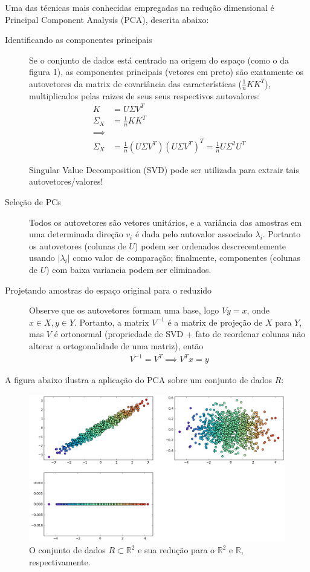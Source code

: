 \documentclass{article}
\begin{document}
	Uma das técnicas mais conhecidas empregadas na redução dimensional é Principal Component Analysis (PCA), descrita abaixo:
	\begin{description}
		\item[Identificando as componentes principais]
		Se o conjunto de dados está centrado na origem do espaço (como o da figura 1), as componentes principais (vetores em preto) são exatamente os autovetores da matrix de covariância das características ($\frac{1}{n} K K^T$), multiplicados pelas raizes de seus seus respectivos autovalores:
		\begin{align*}
			K &= U \Sigma V^T \\
			\Sigma_X &= \frac{1}{n} K K^T \\
			\implies \\
			\Sigma_X &= \frac{1}{n} (U \Sigma V^T) (U \Sigma V^T)^T = \frac{1}{n} U \Sigma^2 U^T
		\end{align*}
		
		Singular Value Decomposition (SVD) pode ser utilizada para extrair tais autovetores/valores!
		
		\item[Seleção de PCs]
		
		Todos os autovetores são vetores unitários, e a variância das amostras em uma determinada direção $v_i$ é dada pelo autovalor associado $\lambda_i$. Portanto os autovetores (colunas de $U$) podem ser ordenados descrecentemente usando $|\lambda_i|$ como valor de comparação; finalmente, componentes (colunas de $U$) com baixa variancia podem ser eliminados.
		
		\item[Projetando amostras do espaço original para o reduzido]
		Observe que os autovetores formam uma base, logo $Vy = x$, onde $x \in X, y \in Y$. Portanto, a matrix $V^{-1}$ é a matrix de projeção de $X$ para $Y$, mas $V$ é ortonormal (propriedade de SVD + fato de reordenar colunas não alterar a ortogonalidade de uma matriz), então
		\begin{align*}
			V^{-1} = V^T \implies V^T x = y
		\end{align*}
	\end{description}
	
	A figura abaixo ilustra a aplicação do PCA sobre um conjunto de dados $R$:
	
		\begin{figure}[H]
			\centering
			\captionsetup{justification=centering}
			
			\includegraphics[width=\linewidth]{assets/r}
			\caption{O conjunto de dados $R \subset \mathbb{R}^2$ e sua redução para o $\mathbb{R}^2$ e $\mathbb{R}$, respectivamente.}
			\label{fig:datasetr}
		\end{figure}
		
\end{document}
